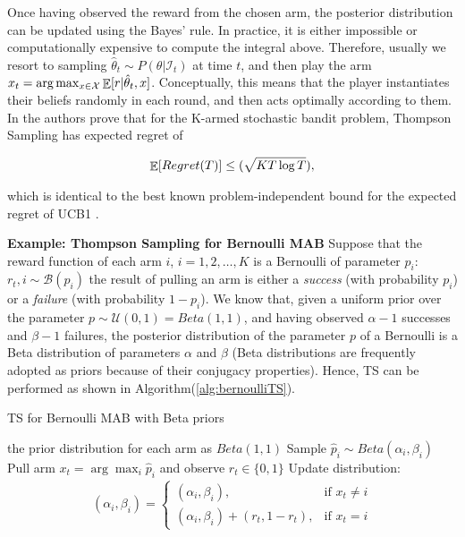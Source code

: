 Once having observed the reward from the chosen arm, the posterior distribution can be updated using the Bayes' rule. In practice, it is either impossible or computationally expensive to compute the integral above. Therefore, usually we resort to sampling $\hat{\theta}_t\sim P(\theta|\mathcal{I}_t)$ at time $t$, and then play the arm $x_t=\arg\max_{x\in\mathcal{X}} \mathop{\mathbb{E}}[r|\hat{\theta}_t,x]$.  Conceptually, this means that the player instantiates their beliefs randomly in each round, and then acts optimally according to them.  \\
In \cite{agrawal2013further} the authors prove that for the K-armed stochastic bandit problem, Thompson Sampling has expected regret of

\begin{align}
\mathop{\mathbb{E}}[Regret(T)]\leq\mathcal(\sqrt{KT\log T}),
\end{align}

which is identical to the best known problem-independent bound for the expected regret of UCB1 \cite{bubeck2012regret}.

\textbf{Example: Thompson Sampling for Bernoulli MAB}
Suppose that the reward function of each arm $i$, $i=1,2,\dots,K$ is a Bernoulli of parameter $p_i$: $r_t,i\sim\mathcal{B}(p_i)$ \ie the result of pulling an arm is either a \emph{success} (with probability $p_i$) or a \emph{failure} (with probability $1-p_i$). We know that, given a uniform prior over the parameter $p\sim\mathcal{U}(0,1)=Beta(1,1)$, and having observed $\alpha-1$ successes and $\beta-1$ failures, the posterior distribution of the parameter $p$ of a Bernoulli is a Beta distribution of parameters $\alpha$ and $\beta$ (Beta distributions are frequently adopted as priors because of their conjugacy properties). Hence, \gls{TS} can be performed as shown in Algorithm(\ref{alg:bernoulliTS}).

\begin{algorithm}[t]
	\caption{\gls{TS} for Bernoulli MAB with Beta priors}
	\label{alg:bernoulliTS}
	\begin{algorithmic}[1]
	 the prior distribution for each arm as $Beta(1,1)$
			\State Sample $\hat{p}_i\sim Beta(\alpha_i,\beta_i)$
		\EndFor
		\State Pull arm $x_t=\arg\max_i\hat{p}_i$ and observe $r_t\in\{0,1\}$
		\State Update distribution:
		\begin{align}
			(\alpha_i,\beta_i) = \begin{cases}(\alpha_i,\beta_i), &\text{if }x_t\neq i \\ (\alpha_i,\beta_i) + (r_t,1-r_t), &\text{if } x_t= i\end{cases}
		\end{align}
	\EndFor
	\end{algorithmic}
\end{algorithm}

